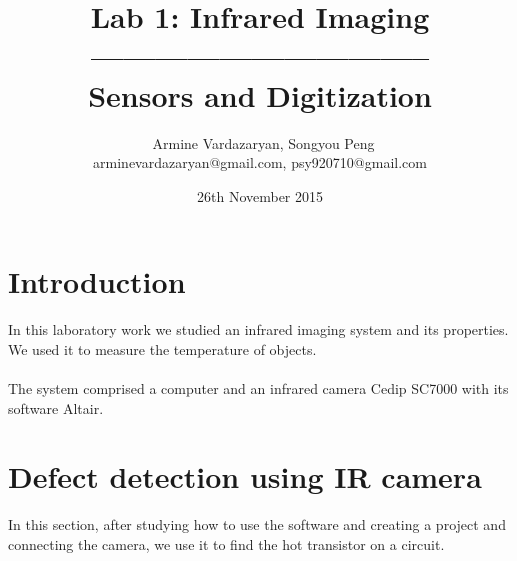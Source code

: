 \documentclass[english]{article}
\begin{document}
\title{Lab 1: Infrared Imaging\\ -------------------------------- \\ \Large Sensors and Digitization}
\author{ \ Armine Vardazaryan, Songyou Peng \\ arminevardazaryan@gmail.com, psy920710@gmail.com}
\date{26th November 2015}

\maketitle

\section{Introduction}
In this laboratory work we studied an infrared imaging system and its properties. 
We used it to measure the temperature of objects. \\
\\
The system comprised a computer and an infrared camera Cedip SC7000 with its software Altair.
\section{Defect detection using IR camera}
In this section, after studying how to use the software and creating a project and connecting the camera, we use it to find the hot transistor on a circuit.
\end{document}
